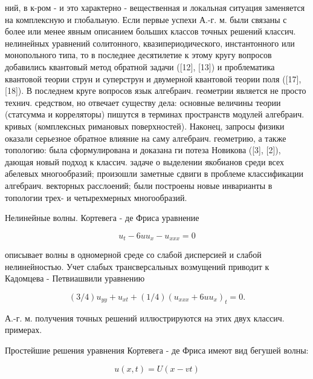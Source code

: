\documentclass[10pt]{article}
\begin{document}
ний, в к-ром - и это характерно - вещественная и локальная ситуация заменяется на комплексную и глобальную. Если первые успехи А.-г. м. были связаны с более или менее явным описанием больших классов точных решений классич. нелинейных уравнений солитонного, квазипериодического, инстантонного или монопольного типа, то в последнее десятилетие к этому кругу вопросов добавились квантовый метод обратной задачи ([12], [13]) и проблематика квантовой теории струн и суперструн и двумерной квантовой теории поля ([17], [18]). В последнем круге вопросов язык алгебраич. геометрии является не просто технич. средством, но отвечает существу дела: основные величины теории (статсумма и корреляторы) пишутся в терминах пространств модулей алгебраич. кривых (комплексных римановых поверхностей). Наконец, запросы физики оказали серьезное обратное влияние на саму алгебраич. геометрию, а также топологию: была сформулирована и доказана ги потеза Новикова ([3], [2]), дающая новый подход к классич. задаче о выделении якобианов среди всех абелевых многообразий; произошли заметные сдвиги в проблеме классификации алгебраич. векторных расслоений; были построены новые инварианты в топологии трех- и четырехмерных многообразий.



Нелинейные волны. Кортевега - де Фриса уравнение



\[

u_{t}-6 u u_{x}-u_{x x x}=0

\]



описывает волны в одномерной среде со слабой дисперсией и слабой нелинейностью. Учет слабых трансверсальных возмущений приводит к Кадомцева - Петвиашвили уравнению



\[

(3 / 4) u_{y y}+u_{x t}+(1 / 4)\left(u_{x x x}+6 u u_{x}\right)_{t}=0 .

\]



А.-г. м. получения точных решений иллюстрируются на этих двух классич. примерах.



Простейшие решения уравнения Кортевега - де Фриса имеют вид бегушей волны:



\[

u(x, t)=U(x-v t)

\]
\end{document}
